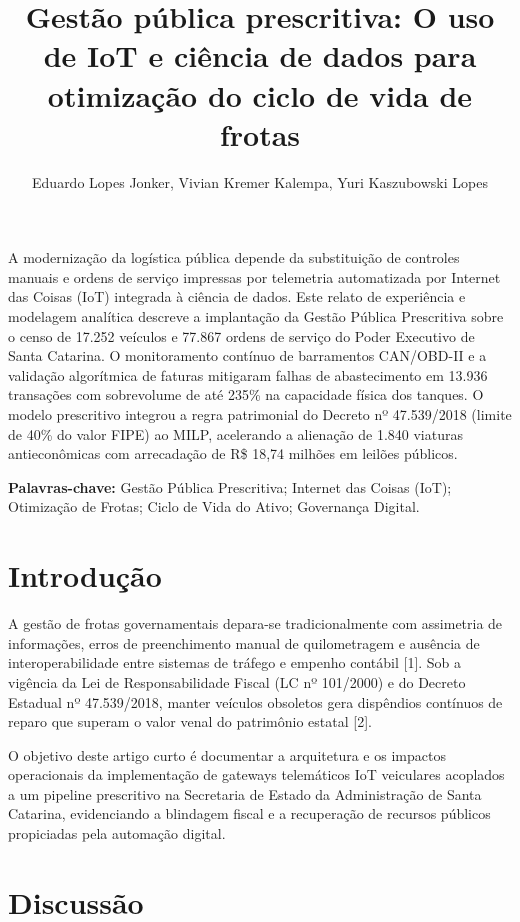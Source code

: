 \documentclass[12pt,a4paper]{article}
\title{\textbf{Gestão pública prescritiva: O uso de IoT e ciência de dados para otimização do ciclo de vida de frotas}}
\author{Eduardo Lopes Jonker\inst{1}, Vivian Kremer Kalempa\inst{1}, Yuri Kaszubowski Lopes\inst{1}}
\begin{document}
\maketitle

\begin{resumo}
A modernização da logística pública depende da substituição de controles manuais e ordens de serviço impressas por telemetria automatizada por Internet das Coisas (IoT) integrada à ciência de dados. Este relato de experiência e modelagem analítica descreve a implantação da Gestão Pública Prescritiva sobre o censo de 17.252 veículos e 77.867 ordens de serviço do Poder Executivo de Santa Catarina. O monitoramento contínuo de barramentos CAN/OBD-II e a validação algorítmica de faturas mitigaram falhas de abastecimento em 13.936 transações com sobrevolume de até 235\% na capacidade física dos tanques. O modelo prescritivo integrou a regra patrimonial do Decreto nº 47.539/2018 (limite de 40\% do valor FIPE) ao MILP, acelerando a alienação de 1.840 viaturas antieconômicas com arrecadação de R\$ 18,74 milhões em leilões públicos.

\vspace{0.2cm}
\noindent\textbf{Palavras-chave:} Gestão Pública Prescritiva; Internet das Coisas (IoT); Otimização de Frotas; Ciclo de Vida do Ativo; Governança Digital.
\end{resumo}



\section{Introdução}

A gestão de frotas governamentais depara-se tradicionalmente com assimetria de informações, erros de preenchimento manual de quilometragem e ausência de interoperabilidade entre sistemas de tráfego e empenho contábil [1]. Sob a vigência da Lei de Responsabilidade Fiscal (LC nº 101/2000) e do Decreto Estadual nº 47.539/2018, manter veículos obsoletos gera dispêndios contínuos de reparo que superam o valor venal do patrimônio estatal [2].

O objetivo deste artigo curto é documentar a arquitetura e os impactos operacionais da implementação de gateways telemáticos IoT veiculares acoplados a um pipeline prescritivo na Secretaria de Estado da Administração de Santa Catarina, evidenciando a blindagem fiscal e a recuperação de recursos públicos propiciadas pela automação digital.


\section{Discussão}
\end{document}
